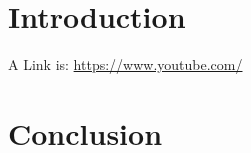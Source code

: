 \documentclass{article}
\title{}
\author{Bruno C. Messias}
\date{}
\begin{document}
\maketitle

\section{Introduction}

A Link is: \url{https://www.youtube.com/}

\subsection{}

\subsection{}

\subsection{}


\section{Conclusion}
\end{document}
